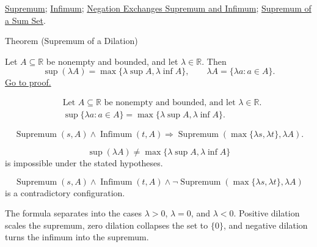 \begin{remark*}[Dependencies]
\hyperref[def:supremum]{Supremum};
\hyperref[def:infimum]{Infimum};
\hyperref[thm:negation-exchange-sup-inf]{Negation Exchanges Supremum and Infimum};
\hyperref[thm:supremum-sum-set]{Supremum of a Sum Set}.
\end{remark*}


\begin{theorembox}{Theorem (Supremum of a Dilation)}
\begin{theorem}
\label{thm:supremum-dilation}
Let $A\subseteq\mathbb{R}$ be nonempty and bounded, and let $\lambda\in\mathbb{R}$. Then
\[
  \sup(\lambda A)=\max\{\lambda\sup A,\lambda\inf A\},
  \qquad
  \lambda A=\{\lambda a:a\in A\}.
\]
\hyperref[prf:supremum-dilation]{Go to proof.}
\end{theorem}
\end{theorembox}

\begin{remark*}
\[
\begin{aligned}
&\text{Let }A\subseteq\mathbb{R}\text{ be nonempty and bounded, and let }\lambda\in\mathbb{R}.\\
&\sup\{\lambda a:a\in A\}=\max\{\lambda\sup A,\lambda\inf A\}.
\end{aligned}
\]
\end{remark*}

\begin{remark*}
\[
\operatorname{Supremum}(s,A)\land \operatorname{Infimum}(t,A)
\Longrightarrow
\operatorname{Supremum}(\max\{\lambda s,\lambda t\},\lambda A).
\]
\end{remark*}

\begin{remark*}
\[
\sup(\lambda A)\ne \max\{\lambda\sup A,\lambda\inf A\}
\]
is impossible under the stated hypotheses.
\end{remark*}

\begin{remark*}
\[
\operatorname{Supremum}(s,A)\land \operatorname{Infimum}(t,A)
\land
\neg\operatorname{Supremum}(\max\{\lambda s,\lambda t\},\lambda A)
\]
is a contradictory configuration.
\end{remark*}

\begin{remark*}
The formula separates into the cases $\lambda>0$, $\lambda=0$, and $\lambda<0$. Positive dilation scales the supremum, zero dilation collapses the set to $\{0\}$, and negative dilation turns the infimum into the supremum.
\end{remark*}

